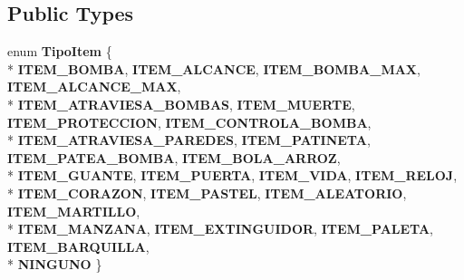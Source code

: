 \subsection*{Public Types}
\begin{DoxyCompactItemize}
\item 
enum {\bfseries Tipo\+Item} \{ \\*
{\bfseries I\+T\+E\+M\+\_\+\+B\+O\+M\+BA}, 
{\bfseries I\+T\+E\+M\+\_\+\+A\+L\+C\+A\+N\+CE}, 
{\bfseries I\+T\+E\+M\+\_\+\+B\+O\+M\+B\+A\+\_\+\+M\+AX}, 
{\bfseries I\+T\+E\+M\+\_\+\+A\+L\+C\+A\+N\+C\+E\+\_\+\+M\+AX}, 
\\*
{\bfseries I\+T\+E\+M\+\_\+\+A\+T\+R\+A\+V\+I\+E\+S\+A\+\_\+\+B\+O\+M\+B\+AS}, 
{\bfseries I\+T\+E\+M\+\_\+\+M\+U\+E\+R\+TE}, 
{\bfseries I\+T\+E\+M\+\_\+\+P\+R\+O\+T\+E\+C\+C\+I\+ON}, 
{\bfseries I\+T\+E\+M\+\_\+\+C\+O\+N\+T\+R\+O\+L\+A\+\_\+\+B\+O\+M\+BA}, 
\\*
{\bfseries I\+T\+E\+M\+\_\+\+A\+T\+R\+A\+V\+I\+E\+S\+A\+\_\+\+P\+A\+R\+E\+D\+ES}, 
{\bfseries I\+T\+E\+M\+\_\+\+P\+A\+T\+I\+N\+E\+TA}, 
{\bfseries I\+T\+E\+M\+\_\+\+P\+A\+T\+E\+A\+\_\+\+B\+O\+M\+BA}, 
{\bfseries I\+T\+E\+M\+\_\+\+B\+O\+L\+A\+\_\+\+A\+R\+R\+OZ}, 
\\*
{\bfseries I\+T\+E\+M\+\_\+\+G\+U\+A\+N\+TE}, 
{\bfseries I\+T\+E\+M\+\_\+\+P\+U\+E\+R\+TA}, 
{\bfseries I\+T\+E\+M\+\_\+\+V\+I\+DA}, 
{\bfseries I\+T\+E\+M\+\_\+\+R\+E\+L\+OJ}, 
\\*
{\bfseries I\+T\+E\+M\+\_\+\+C\+O\+R\+A\+Z\+ON}, 
{\bfseries I\+T\+E\+M\+\_\+\+P\+A\+S\+T\+EL}, 
{\bfseries I\+T\+E\+M\+\_\+\+A\+L\+E\+A\+T\+O\+R\+IO}, 
{\bfseries I\+T\+E\+M\+\_\+\+M\+A\+R\+T\+I\+L\+LO}, 
\\*
{\bfseries I\+T\+E\+M\+\_\+\+M\+A\+N\+Z\+A\+NA}, 
{\bfseries I\+T\+E\+M\+\_\+\+E\+X\+T\+I\+N\+G\+U\+I\+D\+OR}, 
{\bfseries I\+T\+E\+M\+\_\+\+P\+A\+L\+E\+TA}, 
{\bfseries I\+T\+E\+M\+\_\+\+B\+A\+R\+Q\+U\+I\+L\+LA}, 
\\*
{\bfseries N\+I\+N\+G\+U\+NO}
 \}\hypertarget{class_item_ac27aab342f7f159fc444101ae7a5227a}{}\label{class_item_ac27aab342f7f159fc444101ae7a5227a}

\end{DoxyCompactItemize}
